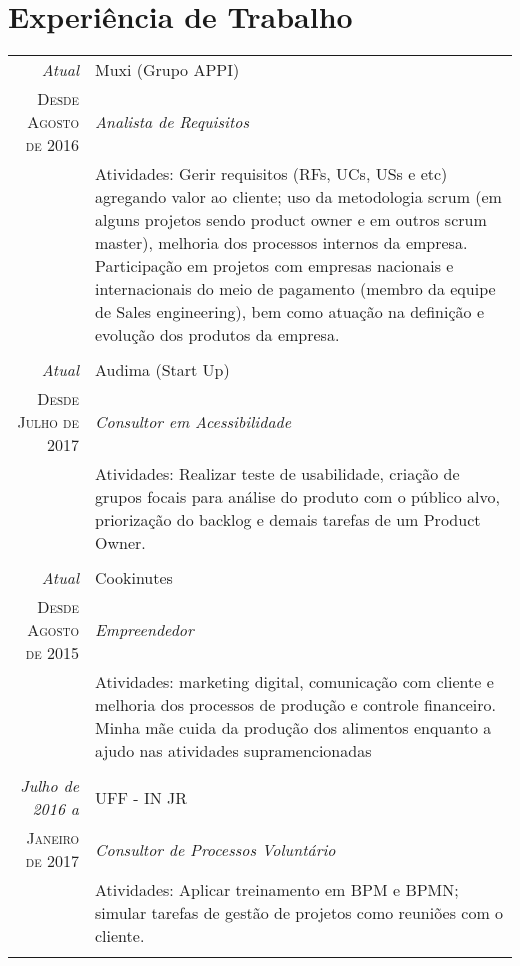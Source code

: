\documentclass[a4paper,10pt]{article}
\begin{document}
\section{Experiência de Trabalho}
\begin{tabular}{r|p{11cm}}
 \emph{Atual} & Muxi (Grupo APPI) \\
 \textsc{Desde Agosto de 2016}&\emph{Analista de Requisitos}\\
 &\footnotesize{Atividades: Gerir requisitos (RFs, UCs, USs e etc) agregando valor ao cliente; uso da metodologia scrum (em alguns projetos sendo product owner e em outros scrum master), melhoria dos processos internos da empresa. Participação em projetos com empresas nacionais e internacionais do meio de pagamento (membro da equipe de Sales engineering), bem como atuação na definição e evolução dos produtos da empresa.}\\
  
 & \\
 
 \emph{Atual} & Audima (Start Up) \\
 \textsc{Desde Julho de 2017}&\emph{Consultor em Acessibilidade}\\
 &\footnotesize{Atividades: Realizar teste de usabilidade, criação de grupos focais para análise do produto com o público alvo, priorização do backlog e demais tarefas de um Product Owner.}\\
 
 & \\
 
 \emph{Atual} & Cookinutes \\
 \textsc{Desde Agosto de 2015}&\emph{Empreendedor}\\
 &\footnotesize{Atividades: marketing digital, comunicação com cliente e melhoria dos processos de produção e controle financeiro. Minha mãe cuida da produção dos alimentos enquanto a ajudo nas atividades supramencionadas}\\
 
 & \\
 
 \emph{Julho de 2016 a} & UFF - IN JR \\
 \textsc{Janeiro de 2017}&\emph{Consultor de Processos Voluntário}\\
 &\footnotesize{Atividades: Aplicar treinamento em BPM e BPMN; simular tarefas de gestão de projetos como reuniões com o cliente.}\\
 
 & \\
 

\end{tabular}
\end{document}
